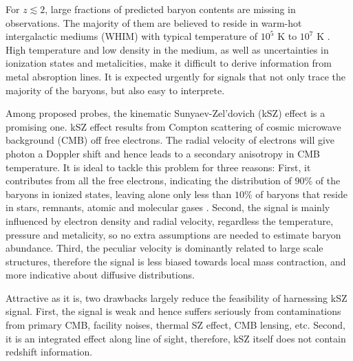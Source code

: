 For $z\lesssim 2$, large fractions of predicted baryon contents are missing in observations.  
The majority of them are believed to reside in warm-hot intergalactic mediums (WHIM) with typical temperature of $10^5$ K to $10^7$ K \cite{Pen1999,Soltan06}. 
High temperature and low density in the medium, 
as well as uncertainties in ionization states and metalicities, 
make it difficult to derive information from metal absroption lines. 
It is expected urgently for signals that not only trace the majority of the baryons, but also easy to interprete.

Among proposed probes, the kinematic Sunyaev-Zel'dovich (kSZ) effect \cite{Sunyaev72,Sunyaev80,Vishniac87} is a promising one.  
kSZ effect results from Compton scattering of cosmic microwave background (CMB) off free electrons. 
The radial velocity of electrons will give photon a Doppler shift 
and hence leads to a 
secondary anisotropy in CMB temperature.
It is ideal to tackle this problem for three reasons: 
First, it contributes from all the free electrons, indicating the distribution of $90\%$ of the baryons in ionized states,   
leaving alone only less than $10\%$ of baryons that 
reside in stars, remnants, atomic and molecular gases \cite{Fukugita04}. 
%
Second, the signal is mainly influenced by electron density and radial velocity, 
regardless the temperature, pressure and metalicity,  
so no extra assumptions are needed to estimate baryon abundance.  
%
Third, the peculiar velocity is dominantly related to large scale structures, 
therefore the signal is less biased towards local mass contraction, 
and more indicative about diffusive distributions.  

Attractive as it is, two drawbacks largely reduce the feasibility of harnessing kSZ signal.  
First, the signal is weak 
and hence suffers seriously from contaminations 
from primary CMB, facility noises, 
thermal SZ effect, CMB lensing, etc.  
Second, it is an integrated effect along line of sight, therefore, kSZ itself does not contain redshift information.

